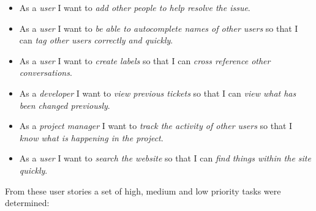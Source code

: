 \documentclass[a4paper]{l3proj}
\begin{document}
\begin{itemize}
\item As a \textit{user} I want to \textit{add other people to help resolve the issue}.
\item As a \textit{user} I want to \textit{be able to autocomplete names of other users} so that I can \textit{tag other users correctly and quickly}.
\item As a \textit{user} I want to \textit{create labels} so that I can \textit{cross reference other conversations}.
\item As a \textit{developer} I want to \textit{view previous tickets} so that I can \textit{view what has been changed previously}.
\item As a \textit{project manager} I want to \textit{track the activity of other users} so that I \textit{know what is happening in the project}.
\item As a \textit{user} I want to \textit{search the website} so that I can \textit{find things within the site quickly}.
\end{itemize}

From these user stories a set of high, medium and low priority tasks were determined:
\end{document}
